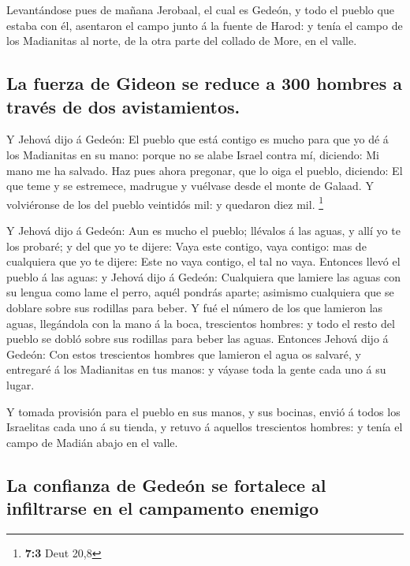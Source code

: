  Levantándose pues de mañana Jerobaal, el cual es Gedeón,
y todo el pueblo que estaba con él, asentaron el campo junto á la fuente
de Harod: y tenía el campo de los Madianitas al norte, de la otra parte
del collado de More, en el valle.

\hypertarget{la-fuerza-de-gideon-se-reduce-a-300-hombres-a-travuxe9s-de-dos-avistamientos.}{%
\subsection{La fuerza de Gideon se reduce a 300 hombres a través de dos
avistamientos.}\label{la-fuerza-de-gideon-se-reduce-a-300-hombres-a-travuxe9s-de-dos-avistamientos.}}

 Y Jehová dijo á Gedeón: El pueblo que está contigo es
mucho para que yo dé á los Madianitas en su mano: porque no se alabe
Israel contra mí, diciendo: Mi mano me ha salvado.  Haz
pues ahora pregonar, que lo oiga el pueblo, diciendo: El que teme y se
estremece, madrugue y vuélvase desde el monte de Galaad. Y volviéronse
de los del pueblo veintidós mil: y quedaron diez mil. \footnote{\textbf{7:3}
  Deut 20,8}

 Y Jehová dijo á Gedeón: Aun es mucho el pueblo; llévalos
á las aguas, y allí yo te los probaré; y del que yo te dijere: Vaya este
contigo, vaya contigo: mas de cualquiera que yo te dijere: Este no vaya
contigo, el tal no vaya.  Entonces llevó el pueblo á las
aguas: y Jehová dijo á Gedeón: Cualquiera que lamiere las aguas con su
lengua como lame el perro, aquél pondrás aparte; asimismo cualquiera que
se doblare sobre sus rodillas para beber.  Y fué el número
de los que lamieron las aguas, llegándola con la mano á la boca,
trescientos hombres: y todo el resto del pueblo se dobló sobre sus
rodillas para beber las aguas.  Entonces Jehová dijo á
Gedeón: Con estos trescientos hombres que lamieron el agua os salvaré, y
entregaré á los Madianitas en tus manos: y váyase toda la gente cada uno
á su lugar.

 Y tomada provisión para el pueblo en sus manos, y sus
bocinas, envió á todos los Israelitas cada uno á su tienda, y retuvo á
aquellos trescientos hombres: y tenía el campo de Madián abajo en el
valle.

\hypertarget{la-confianza-de-gedeuxf3n-se-fortalece-al-infiltrarse-en-el-campamento-enemigo}{%
\subsection{La confianza de Gedeón se fortalece al infiltrarse en el
campamento
enemigo}\label{la-confianza-de-gedeuxf3n-se-fortalece-al-infiltrarse-en-el-campamento-enemigo}}

